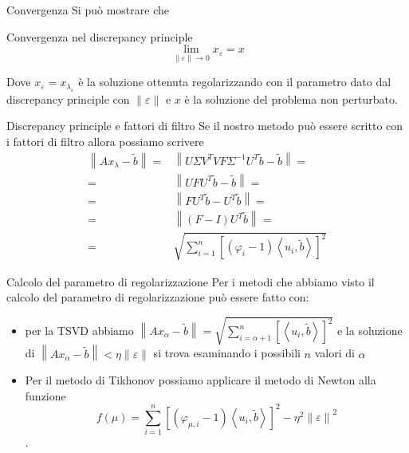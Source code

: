 \documentclass{beamer}
\theoremstyle{plain}
\theoremstyle{definition}
\theoremstyle{remark}
\newcommand{\pa}[1]{\left(#1\right)}
\newcommand{\ang}[1]{\left<#1\right>}
\newcommand{\bra}[1]{\left[#1\right]}
\newcommand{\norm}[1]{\left\|#1\right\|}
\begin{document}
\begin{frame}{Convergenza}
  Si può mostrare che
  \begin{block}{Convergenza nel discrepancy principle}
    \[ \lim \limits _{\norm{\varepsilon} \to 0} x _\varepsilon = x \]
  \end{block}
  Dove $x_\varepsilon = x_{\lambda _ \varepsilon}$ è la soluzione
  ottenuta regolarizzando con il parametro dato dal discrepancy
  principle con $\norm{\varepsilon}$ e $x$ è la soluzione del problema
  non perturbato.
\end{frame}

\begin{frame}{Discrepancy principle e fattori di filtro}
  Se il nostro metodo può essere scritto con i fattori di filtro
  allora possiamo scrivere
  \begin{align*}
    \norm{ Ax_\lambda - \tilde b } =& \norm{ U \Sigma V^T V F \Sigma
      ^{-1} U^T \tilde b - \tilde b} =\\
    =& \norm { U F U^T \tilde b - \tilde b} =\\
    = & \norm{ F U^T \tilde b - U^T \tilde b } =\\
    =& \norm{ \pa{F-I} U^T \tilde b} =\\
    =& \sqrt{\sum _{i=1} ^n \bra{ \pa{ \varphi _i -1} \ang{ u_i, \tilde b} } ^2}
  \end{align*}
\end{frame}

\begin{frame}{Calcolo del parametro di regolarizzazione}
  Per i metodi che abbiamo visto il calcolo del parametro di
  regolarizzazione può essere fatto con:
  \begin{itemize}
  \item per la TSVD abbiamo $\norm{ Ax_\alpha - \tilde b } =
    \sqrt{\sum _{i=\alpha +1} ^n \bra{ \ang{ u_i, \tilde b} } ^2 }$ e
    la soluzione di $\norm{ Ax_\alpha - \tilde b } <\eta
    \norm{\varepsilon}$ si trova esaminando i possibili $n$ valori di
    $\alpha$
  \item Per il metodo di Tikhonov possiamo applicare il metodo di
    Newton alla funzione \[f(\mu) = \sum _{i=1} ^n \bra{ \pa{ \varphi
        _{\mu,i} -1} \ang{ u_i, \tilde b} } ^2 - \eta ^2
    \norm{\varepsilon} ^2 \].
  \end{itemize}
\end{frame}
\end{document}
